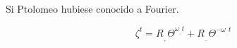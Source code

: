 \documentclass[preview]{standalone}
\begin{document}
\begin{center}
Si Ptolomeo  hubiese conocido a Fourier.

$$\zeta ^ t=  R_{_{_+}} \Theta^{\omega_{_{_+}} t} +R_{_{_-}} \Theta^{-\omega_{_{_-}} t}$$
\end{center}
\end{document}
